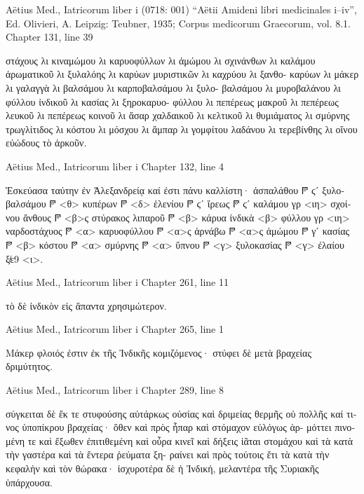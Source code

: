\documentclass[12pt,letterpaper,twoside,final]{memoir}
\begin{document}
\begin{greek}

Aëtius Med., Iatricorum liber i (0718: 001)
“Aëtii Amideni libri medicinales i–iv”, Ed. Olivieri, A.
Leipzig: Teubner, 1935; Corpus medicorum Graecorum, vol. 8.1.
Chapter 131, line 39

                                                                      στάχους 
λι κιναμώμου λι καρυοφύλλων λι ἀμώμου λι σχινάνθων λι καλάμου 
ἀρωματικοῦ λι ξυλαλόης λι καρύων μυριστικῶν λι καχρύου λι ξανθο-
καρύων λι μάκερ λι γαλαγγὰ λι βαλσάμου λι καρποβαλσάμου λι ξυλο-
βαλσάμου λι μυροβαλάνου λι φύλλου ἰνδικοῦ λι κασίας λι ξηροκαρυο-
φύλλου λι πεπέρεως μακροῦ λι πεπέρεως λευκοῦ λι πεπέρεως κοινοῦ 
λι ἄσαρ χαλδαικοῦ λι κελτικοῦ λι θυμιάματος λι σμύρνης τρωγλίτιδος 
λι κόστου λι μόσχου λι ἄμπαρ λι γομφίτου λαδάνου λι τερεβίνθης λι 
οἴνου εὐώδους τὸ ἀρκοῦν. 



Aëtius Med., Iatricorum liber i 
Chapter 132, line 4

                                Ἐσκεύασα ταύτην ἐν Ἀλεξανδρείᾳ καί 
ἐστι πάνυ καλλίστη· ἀσπαλάθου 𐆄 ϛʹ ξυλοβαλσάμου 𐆄 <θ> κυπέρων 
𐆄 <δ> ἑλενίου 𐆄 ϛʹ ἴρεως 𐆄 ϛʹ καλάμου γρ <ιη> σχοίνου ἄνθους 𐆄 <β>ς 
στύρακος λιπαροῦ 𐆄 <β> κάρυα ἰνδικὰ <β> φύλλου γρ <ιη> ναρδοστάχυος 
𐆄 <α> καρυοφύλλου 𐆄 <α>ς ἀρνάβω 𐆄 <α>ς ἀμώμου 𐆄 γʹ κασίας 𐆄 <β> 
κόστου 𐆄 <α> σμύρνης 𐆄 <α> ὕπνου 𐆄 <γ> ξυλοκασίας 𐆄 <γ> ἐλαίου ξ̸ε9 <ι>. 



Aëtius Med., Iatricorum liber i 
Chapter 261, line 11

         τὸ δὲ ἰνδικὸν εἰς ἅπαντα χρησιμώτερον. 



Aëtius Med., Iatricorum liber i 
Chapter 265, line 1

Μάκερ φλοιός ἐστιν ἐκ τῆς Ἰνδικῆς κομιζόμενος· στύφει δὲ μετὰ 
βραχείας δριμύτητος. 



Aëtius Med., Iatricorum liber i 
Chapter 289, line 8

                                                   σύγκειται δὲ ἔκ τε 
στυφούσης αὐτάρκως οὐσίας καὶ δριμείας θερμῆς οὐ πολλῆς καί τινος 
ὑποπίκρου βραχείας· ὅθεν καὶ πρὸς ἧπαρ καὶ στόμαχον εὐλόγως ἁρ-
μόττει πινομένη τε καὶ ἔξωθεν ἐπιτιθεμένη καὶ οὖρα κινεῖ καὶ δήξεις 
ἰᾶται στομάχου καὶ τὰ κατὰ τὴν γαστέρα καὶ τὰ ἔντερα ῥεύματα ξη-
ραίνει καὶ πρὸς τούτοις ἔτι τὰ κατὰ τὴν κεφαλὴν καὶ τὸν θώρακα· 
ἰσχυροτέρα δὲ ἡ Ἰνδική, μελαντέρα τῆς Συριακῆς ὑπάρχουσα. 




\end{greek}
\end{document}
